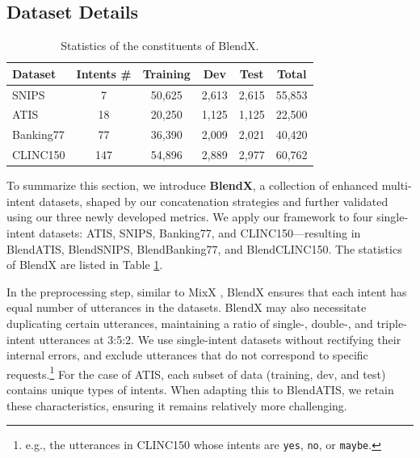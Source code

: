\subsection{Dataset Details}  \label{subsec:dataset_details}

\begin{table}[t]
    \footnotesize
    \centering
    \setlength{\tabcolsep}{0.3em}
    \begin{tabular}{l c c c c c}
        \toprule
            \textbf{Dataset} & \textbf{Intents \#} & \textbf{Training} & \textbf{Dev} &\textbf{Test} & \textbf{Total} \\
        \midrule
            SNIPS & 7 & 50,625 & 2,613 & 2,615 & 55,853 \\
            ATIS & 18 & 20,250 & 1,125 & 1,125 & 22,500 \\
            Banking77 & 77 & 36,390 & 2,009 & 2,021 & 40,420 \\
            CLINC150 & 147 & 54,896 & 2,889 & 2,977 & 60,762 \\
        \bottomrule
    \end{tabular}
    \caption{Statistics of the constituents of BlendX.}
    \centering
    \label{table:BlendX_statistics}
\end{table}

To summarize this section, we introduce \textbf{BlendX}, a collection of enhanced multi-intent datasets, shaped by our concatenation strategies and further validated using our three newly developed metrics.
We apply our framework to four single-intent datasets: ATIS, SNIPS, Banking77, and CLINC150---resulting in BlendATIS, BlendSNIPS, BlendBanking77, and BlendCLINC150.
The statistics of BlendX are listed in Table \ref{table:BlendX_statistics}.

In the preprocessing step, similar to  MixX , BlendX ensures that each intent has equal number of utterances in the datasets. 
BlendX may also necessitate duplicating certain utterances, maintaining a ratio of single-, double-, and triple-intent utterances at 3:5:2.
We use single-intent datasets without rectifying their internal errors, and exclude utterances that do not correspond to specific requests.\footnote{e.g., the utterances in CLINC150 whose intents are \texttt{yes}, \texttt{no}, or \texttt{maybe}.} 
For the case of ATIS, each subset of data (training, dev, and test) contains unique types of intents. 
When adapting this to BlendATIS, we retain these characteristics, ensuring it remains relatively more challenging.


